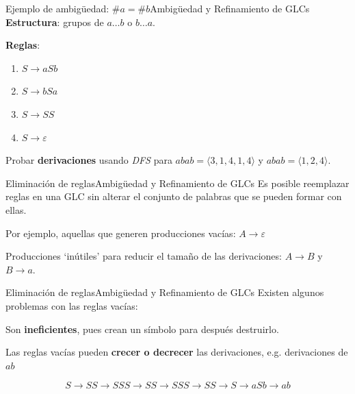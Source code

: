 \documentclass[spanish, handout]{beamer}
\begin{document}
\begin{frame}{Ejemplo de ambigüedad: $\#a = \#b$}{Ambigüedad y Refinamiento de GLCs}
    \textbf{Estructura}: grupos de $a \dots b$ o $b \dots a$. \pause

    \bigskip

    \textbf{Reglas}:
    \begin{enumerate}
        \item $S \to aSb$
        \item $S \to bSa$
        \item $S \to SS$
        \item $S \to \varepsilon$
    \end{enumerate} \pause

    \bigskip

    Probar \textbf{derivaciones} usando \textit{DFS} para $abab = \langle 3, 1, 4, 1, 4  \rangle$ y $ abab = \langle 1, 2, 4 \rangle$.
\end{frame}

\begin{frame}{Eliminación de reglas}{Ambigüedad y Refinamiento de GLCs}
    Es posible reemplazar reglas en una GLC sin alterar el conjunto de palabras que se pueden formar con ellas. \pause

    \bigskip

    Por ejemplo, aquellas que generen producciones vacías: $A \to \varepsilon$ \pause

    \bigskip

    Producciones `inútiles' para reducir el tamaño de las derivaciones: $A \to B$ y $B \to a$.
\end{frame}

\begin{frame}{Eliminación de reglas}{Ambigüedad y Refinamiento de GLCs}
    Existen algunos problemas con las reglas vacías: \pause

    \bigskip

    Son \textbf{ineficientes}, pues crean un símbolo para después destruirlo. \pause

    \bigskip

    Las reglas vacías pueden \textbf{crecer o decrecer} las derivaciones, e.g. derivaciones de $ab$ \pause

    \bigskip

    $$S \to SS \to SSS \to SS \to SSS \to SS \to S \to aSb \to ab$$
\end{frame}
\end{document}
